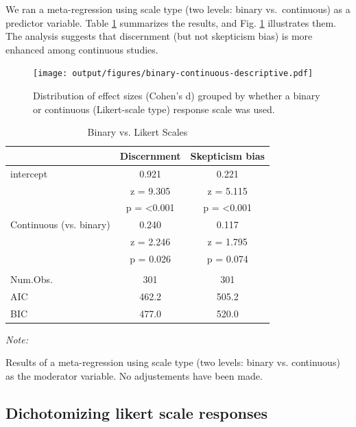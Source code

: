 \documentclass[
  man]{apa6}
\begin{document}
We ran a meta-regression using scale type (two levels: binary vs.~continuous) as a predictor variable. Table \ref{tab:binary-vs-continuous-regression} summarizes the results, and Fig. \ref{fig:binary-continuous-descriptive} illustrates them. The analysis suggests that discernment (but not skepticism bias) is more enhanced among continuous studies.



\begin{figure}
\centering
\texttt{[image: output/figures/binary-continuous-descriptive.pdf]}
\caption{\label{fig:binary-continuous-descriptive}Distribution of effect sizes (Cohen's d) grouped by whether a binary or continuous (Likert-scale type) response scale was used.}
\end{figure}

\begin{table}
\centering
\caption{\label{tab:binary-vs-continuous-regression}Binary vs. Likert Scales}
\centering
\begin{threeparttable}
\begin{tabular}[t]{lcc}
\toprule
  & Discernment & Skepticism  bias\\
\midrule
intercept & 0.921 & 0.221\\
 & z = 9.305 & z = 5.115\\
 & p = <0.001 & p = <0.001\\
Continuous (vs. binary) & 0.240 & 0.117\\
 & z = 2.246 & z = 1.795\\
 & p = 0.026 & p = 0.074\\
\midrule\\
Num.Obs. & 301 & 301\\
AIC & 462.2 & 505.2\\
BIC & 477.0 & 520.0\\
\bottomrule
\end{tabular}
\begin{tablenotes}
\item \textit{Note: } 
\item Results of a meta-regression using scale type (two levels: binary vs. continuous) as the moderator variable. No adjustements have been made.
\end{tablenotes}
\end{threeparttable}
\end{table}

\subsection{Dichotomizing likert scale responses}\label{dichotomizing-likert-scale-responses}
\end{document}
